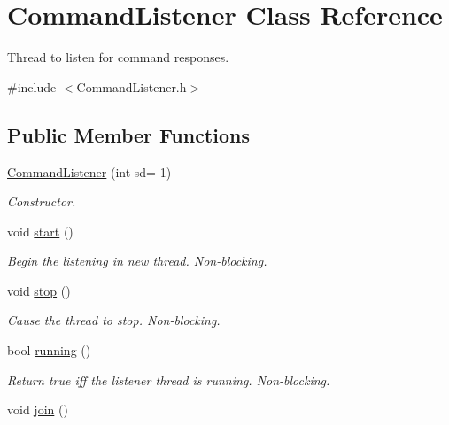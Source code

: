 \hypertarget{classCommandListener}{\section{\-Command\-Listener \-Class \-Reference}
\label{classCommandListener}
}


\-Thread to listen for command responses.  




{\ttfamily \#include $<$\-Command\-Listener.\-h$>$}

\subsection*{\-Public \-Member \-Functions}
\begin{DoxyCompactItemize}
\item 
\hyperlink{classCommandListener_a7a53d67e8f22014cd84e27681445af0a}{\-Command\-Listener} (int sd=-\/1)
\begin{DoxyCompactList}\small\item\em \-Constructor. \end{DoxyCompactList}\item 
\hypertarget{classCommandListener_a543c8694cf5bb6a15e76389a812c68a7}{void \hyperlink{classCommandListener_a543c8694cf5bb6a15e76389a812c68a7}{start} ()}\label{classCommandListener_a543c8694cf5bb6a15e76389a812c68a7}

\begin{DoxyCompactList}\small\item\em \-Begin the listening in new thread. \-Non-\/blocking. \end{DoxyCompactList}\item 
\hypertarget{classCommandListener_a071496d6650f9a451aa401d6a57d9f28}{void \hyperlink{classCommandListener_a071496d6650f9a451aa401d6a57d9f28}{stop} ()}\label{classCommandListener_a071496d6650f9a451aa401d6a57d9f28}

\begin{DoxyCompactList}\small\item\em \-Cause the thread to stop. \-Non-\/blocking. \end{DoxyCompactList}\item 
\hypertarget{classCommandListener_acc56f5ae79bc38527d04e6dc478031c2}{bool \hyperlink{classCommandListener_acc56f5ae79bc38527d04e6dc478031c2}{running} ()}\label{classCommandListener_acc56f5ae79bc38527d04e6dc478031c2}

\begin{DoxyCompactList}\small\item\em \-Return true iff the listener thread is running. \-Non-\/blocking. \end{DoxyCompactList}\item 
\hypertarget{classCommandListener_a5eca6e5aae23e3570ab739e29ac46c9d}{void \hyperlink{classCommandListener_a5eca6e5aae23e3570ab739e29ac46c9d}{join} ()}\label{classCommandListener_a5eca6e5aae23e3570ab739e29ac46c9d}


\end{DoxyCompactItemize}
